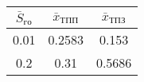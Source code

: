 \begin{tabular}{|c|c|c|}
\hline
$\bar{S}_{го}$ & $\bar{x}_{ТПП}$ & $\bar{x}_{ТПЗ}$ \\ 
\hline
0.01 & 0.2583 & 0.153 \\ 
\hline
0.2 & 0.31 & 0.5686 \\ 
\hline
\end{tabular}